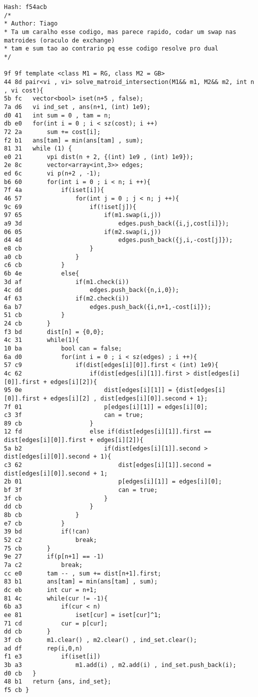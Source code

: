 \documentclass[11pt, a4paper, twoside]{article}
\begin{document}
\begin{lstlisting}
Hash: f54acb
/*
* Author: Tiago
* Ta um caralho esse codigo, mas parece rapido, codar um swap nas matroides (oraculo de exchange)
* tam e sum tao ao contrario pq esse codigo resolve pro dual
*/

9f 9f template <class M1 = RG, class M2 = GB>
44 8d pair<vi , vi> solve_matroid_intersection(M1&& m1, M2&& m2, int n , vi cost){
5b fc 	vector<bool> iset(n+5 , false);
7a d6 	vi ind_set , ans(n+1, (int) 1e9);
d0 41 	int sum = 0 , tam = n;
db e0 	for(int i = 0 ; i < sz(cost); i ++)
72 2a 		sum += cost[i];
f2 b1 	ans[tam] = min(ans[tam] , sum);
81 31 	while (1) {
e0 21 		vpi dist(n + 2, {(int) 1e9 , (int) 1e9});
2e 8c 		vector<array<int,3>> edges;
ed 6c 		vi p(n+2 , -1);
b6 60 		for(int i = 0 ; i < n; i ++){
7f 4a 			if(iset[i]){
46 57 				for(int j = 0 ; j < n; j ++){
9c 69 					if(!iset[j]){
97 65 						if(m1.swap(i,j))
a9 3d 							edges.push_back({i,j,cost[i]});
06 05 						if(m2.swap(i,j))
d4 4d 							edges.push_back({j,i,-cost[j]});
e8 cb 					}
a0 cb 				}
c6 cb 			}
6b 4e 			else{
3d af 				if(m1.check(i))
4c dd 					edges.push_back({n,i,0});
4f 63 				if(m2.check(i))
6a b7 					edges.push_back({i,n+1,-cost[i]});
51 cb 			}
24 cb 		}
f3 bd 		dist[n] = {0,0};
4c 31 		while(1){
10 ba 			bool can = false;
6a d0 			for(int i = 0 ; i < sz(edges) ; i ++){
57 c9 				if(dist[edges[i][0]].first < (int) 1e9){
4c 62 					if(dist[edges[i][1]].first > dist[edges[i][0]].first + edges[i][2]){
95 0e 						dist[edges[i][1]] = {dist[edges[i][0]].first + edges[i][2] , dist[edges[i][0]].second + 1};
7f 01 						p[edges[i][1]] = edges[i][0];
c3 3f 						can = true;
89 cb 					}
12 fd 					else if(dist[edges[i][1]].first == dist[edges[i][0]].first + edges[i][2]){
5a b2 						if(dist[edges[i][1]].second > dist[edges[i][0]].second + 1){
c3 62 							dist[edges[i][1]].second = dist[edges[i][0]].second + 1;
2b 01 							p[edges[i][1]] = edges[i][0];
bf 3f 							can = true;
3f cb 						}
dd cb 					}
8b cb 				}
e7 cb 			}
39 bd 			if(!can)
52 c2 				break;
75 cb 		}
9e 27 		if(p[n+1] == -1)
7a c2 			break;
cc e0 		tam -- , sum += dist[n+1].first;
83 b1 		ans[tam] = min(ans[tam] , sum);
dc eb 		int cur = n+1;
81 4c 		while(cur != -1){
6b a3 			if(cur < n)
ee 81 				iset[cur] = iset[cur]^1;
71 cd 			cur = p[cur];
dd cb 		}
3f cb 		m1.clear() , m2.clear() , ind_set.clear();
ad df 		rep(i,0,n)
f1 e3 			if(iset[i])
3b a3 				m1.add(i) , m2.add(i) , ind_set.push_back(i);
d0 cb 	}
48 b1 	return {ans, ind_set};
f5 cb }
\end{lstlisting}
\end{document}

